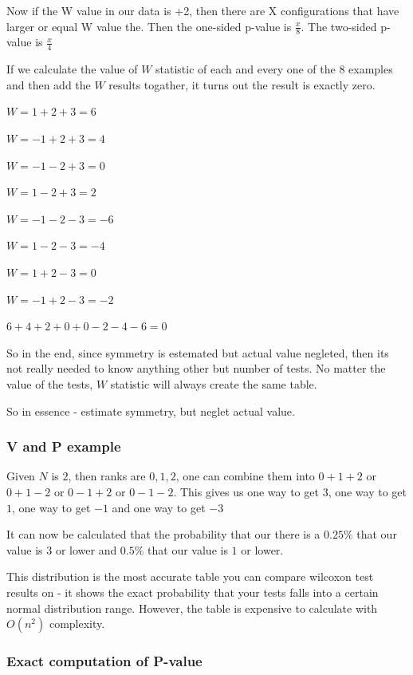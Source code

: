 \documentclass[12pt]{article}
\begin{document}
Now if the W value in our data is +2, then there are X configurations that have larger or equal W value the. Then the one-sided p-value is $\frac{x}{8}$. The two-sided p-value is $\frac{x}{4}$

If we calculate the value of $W$ statistic of each and every one of the 8 examples and then add the $W$ results togather, it turns out the result is exactly zero.

$W = 1 + 2 + 3 = 6$

$W = -1 + 2 + 3 = 4$

$W = -1 - 2 + 3 = 0$

$W = 1 - 2 + 3 = 2$

$W = -1 - 2 - 3 = -6$

$W = 1 - 2 - 3 = -4$

$W = 1 + 2 - 3 = 0$

$W = -1 + 2 - 3 = -2$

$6 + 4 + 2 + 0 + 0 -2 - 4 - 6 = 0$

So in the end, since symmetry is estemated but actual value negleted, then its not really needed to know anything other but number of tests. No matter the value of the tests, $W$ statistic will always create the same table.

So in essence - estimate symmetry, but neglet actual value.

\subsubsection{V and P example}

Given $N$ is $2$, then ranks are ${0, 1, 2}$, one can combine them into $0 + 1 + 2$ or $0 + 1 - 2$ or $0 - 1 + 2$ or $0 - 1 - 2$. This gives us one way to get $3$, one way to get $1$, one way to get $-1$ and one way to get $-3$

It can now be calculated that the probability that our there is a $0.25\%$ that our value is $3$ or lower and $0.5\%$ that our value is $1$ or lower.

This distribution is the most accurate table you can compare wilcoxon test results on - it shows the exact probability that your tests falls into a certain normal distribution range. However, the table is expensive to calculate with $O(n^2)$ complexity.

\subsubsection{Exact computation of P-value}
\end{document}
